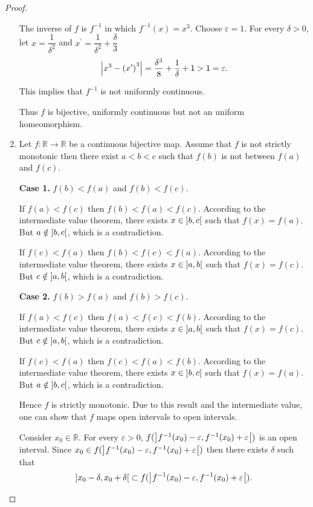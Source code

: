 \begin{proof}
\begin{enumerate}[label={(\alph*)}]
		      The inverse of \( f \) is \( f^{-1} \) in which \( f^{-1}(x) = x^{3} \). Choose \( \varepsilon = 1 \). For every \( \delta > 0 \), let \( x = \dfrac{1}{\delta^{2}} \) and \( x^{\prime} = \dfrac{1}{\delta^{2}} + \dfrac{\delta}{3} \)
		      \[
			      \left\vert{x^{3} - {(x^{\prime})}^{3}}\right\vert = \dfrac{\delta^{3}}{8} + \dfrac{1}{\delta} + 1 > 1 = \varepsilon.
		      \]

		      This implies that \( f^{-1} \) is not uniformly continuous.

		      Thus \( f \) is bijective, uniformly continuous but not an uniform homeomorphism.
		\item Let \( f: \mathbb{R} \to \mathbb{R} \) be a continuous bijective map. Assume that \( f \) is not strictly monotonic then there exist \( a < b < c \) such that \( f(b) \) is not between \( f(a) \) and \( f(c) \).

		      \textbf{Case 1.} \( f(b) < f(a) \) and \( f(b) < f(c) \).

		      If \( f(a) < f(c) \) then \( f(b) < f(a) < f(c) \). According to the intermediate value theorem, there exists \( x \in \left\rbrack{b, c}\right\lbrack \) such that \( f(x) = f(a) \). But \( a \notin \left\rbrack{b, c}\right\lbrack \), which is a contradiction.

		      If \( f(c) < f(a) \) then \( f(b) < f(c) < f(a) \). According to the intermediate value theorem, there exists \( x \in \left\rbrack{a, b}\right\lbrack \) such that \( f(x) = f(c) \). But \( c \notin \left\rbrack{a, b}\right\lbrack \), which is a contradiction.

		      \textbf{Case 2.} \( f(b) > f(a) \) and \( f(b) > f(c) \).

		      If \( f(a) < f(c) \) then \( f(a) < f(c) < f(b) \). According to the intermediate value theorem, there exists \( x \in \left\rbrack{a, b}\right\lbrack \) such that \( f(x) = f(c) \). But \( c \notin \left\rbrack{a, b}\right\lbrack \), which is a contradiction.

		      If \( f(c) < f(a) \) then \( f(c) < f(a) < f(b) \). According to the intermediate value theorem, there exists \( x \in \left\rbrack{b, c}\right\lbrack \) such that \( f(x) = f(a) \). But \( a \notin \left\rbrack{b, c}\right\lbrack \), which is a contradiction.

		      Hence \( f \) is strictly monotonic. Due to this result and the intermediate value, one can show that \( f \) maps open intervals to open intervals.

		      Consider \( x_{0} \in \mathbb{R} \). For every \( \varepsilon > 0 \), \( f(\left\rbrack{f^{-1}(x_{0}) - \varepsilon, f^{-1}(x_{0}) + \varepsilon}\right\lbrack) \) is an open interval. Since \( x_{0} \in f(\left\rbrack{f^{-1}(x_{0}) - \varepsilon, f^{-1}(x_{0}) + \varepsilon}\right\lbrack) \) then there exists \( \delta \) such that
		      \[
			      \left\rbrack{x_{0} - \delta, x_{0} + \delta}\right\lbrack \subset f(\left\rbrack{f^{-1}(x_{0}) - \varepsilon, f^{-1}(x_{0}) + \varepsilon}\right\lbrack).
		      \]


\end{enumerate}
\end{proof}
